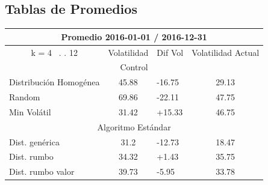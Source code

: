 \documentclass[12pt,a4paper]{article}
\begin{document}
	\subsection{Tablas de Promedios}
\begin{table}[H]
\centering
\begin{tabular}{l|c|l|c|} 
\hline
\multicolumn{4}{c}{{\cellcolor[rgb]{0.635,0.647,0.788}}Promedio 2016-01-01 / 2016-12-31}                                                                                             \\ 
\hline
\multicolumn{1}{c|}{{\cellcolor[rgb]{0.635,0.647,0.788}}k = 4~ . . 12} & Volatilidad                       & Dif Vol                            & Volatilidad Actual                 \\ 
\hline
\multicolumn{4}{c}{{\cellcolor[rgb]{0.796,0.808,0.984}}Control}                                                                                                                      \\ 
\hline
\rowcolor[rgb]{0.925,0.957,1} Distribución Homogénea                   & 45.88                             & -16.75                             & 29.13                              \\
\rowcolor[rgb]{0.855,0.91,0.988} Random                                & 69.86                             & -22.11                             & 47.75                              \\
\rowcolor[rgb]{0.925,0.957,1} Min Volátil                              & 31.42                             & +15.33                             & 46.75                              \\ 
\hline
\multicolumn{4}{c}{{\cellcolor[rgb]{0.796,0.808,0.984}}Algoritmo Estándar}                                                                                                           \\ 
\hline
\rowcolor[rgb]{0.925,0.957,1} Dist. genérica                           & 31.2                              & \textcolor[rgb]{0,0.502,0}{-12.73} & \textcolor[rgb]{0,0.502,0}{18.47}  \\
\rowcolor[rgb]{0.855,0.91,0.988} Dist. rumbo                           & 34.32                             & +1.43                              & 35.75                              \\
\rowcolor[rgb]{0.925,0.957,1} Dist. rumbo valor                        & 39.73                             & -5.95                              & 33.78                              \\ 

\end{tabular}
\end{table}
\end{document}
